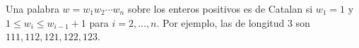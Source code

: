 Una palabra $w = w_1 w_2 \cdots w_n$ sobre los enteros positivos es de Catalan si $w_1 = 1$ y $1 \le w_i \le w_{i-1} + 1$ para $i = 2,\dots,n$. Por ejemplo, las de longitud 3 son $111,112,121,122,123$.
